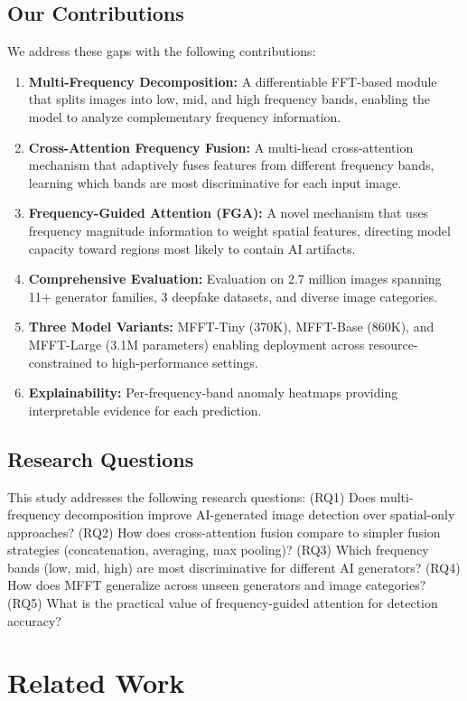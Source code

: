 \documentclass[journal]{IEEEtran}
\begin{document}
\subsection{Our Contributions}
We address these gaps with the following contributions:
\begin{enumerate}
    \item \textbf{Multi-Frequency Decomposition:} A differentiable FFT-based module that splits images into low, mid, and high frequency bands, enabling the model to analyze complementary frequency information.
    \item \textbf{Cross-Attention Frequency Fusion:} A multi-head cross-attention mechanism that adaptively fuses features from different frequency bands, learning which bands are most discriminative for each input image.
    \item \textbf{Frequency-Guided Attention (FGA):} A novel mechanism that uses frequency magnitude information to weight spatial features, directing model capacity toward regions most likely to contain AI artifacts.
    \item \textbf{Comprehensive Evaluation:} Evaluation on 2.7 million images spanning 11+ generator families, 3 deepfake datasets, and diverse image categories.
    \item \textbf{Three Model Variants:} MFFT-Tiny (370K), MFFT-Base (860K), and MFFT-Large (3.1M parameters) enabling deployment across resource-constrained to high-performance settings.
    \item \textbf{Explainability:} Per-frequency-band anomaly heatmaps providing interpretable evidence for each prediction.
\end{enumerate}

\subsection{Research Questions}
This study addresses the following research questions: (RQ1) Does multi-frequency decomposition improve AI-generated image detection over spatial-only approaches? (RQ2) How does cross-attention fusion compare to simpler fusion strategies (concatenation, averaging, max pooling)? (RQ3) Which frequency bands (low, mid, high) are most discriminative for different AI generators? (RQ4) How does MFFT generalize across unseen generators and image categories? (RQ5) What is the practical value of frequency-guided attention for detection accuracy?

\section{Related Work}
\end{document}
